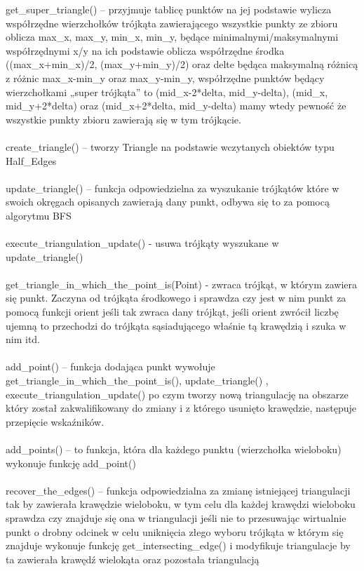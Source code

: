 \documentclass[12pt]{article}
\begin{document}
get\_super\_triangle() – przyjmuje tablicę punktów na jej podstawie wylicza współrzędne wierzchołków trójkąta zawierającego wszystkie punkty ze zbioru oblicza max\_x, max\_y, min\_x, min\_y, będące minimalnymi/maksymalnymi współrzędnymi x/y na ich podstawie oblicza współrzędne środka ((max\_x+min\_x)/2, (max\_y+min\_y)/2) oraz delte będąca maksymalną różnicą z różnic max\_x-min\_y oraz max\_y-min\_y, współrzędne punktów będący wierzchołkami „super trójkąta” to (mid\_x-2*delta, mid\_y-delta), (mid\_x, mid\_y+2*delta) oraz (mid\_x+2*delta, mid\_y-delta) mamy wtedy pewność że wszystkie punkty zbioru zawierają się w tym trójkącie.
\\ \\ 
create\_triangle() – tworzy Triangle na podstawie wczytanych obiektów typu Half\_Edges
\\ \\ 
update\_triangle() – funkcja odpowiedzielna za wyszukanie trójkątów które w swoich okręgach opisanych zawierają dany punkt, odbywa się to za pomocą algorytmu BFS
\\ \\ 
execute\_triangulation\_update() - usuwa trójkąty wyszukane w update\_triangle()
\\ \\ 
get\_triangle\_in\_which\_the\_point\_is(Point) - zwraca trójkąt, w którym zawiera się punkt. Zaczyna od trójkąta środkowego i sprawdza czy jest w nim punkt za pomocą funkcji orient jeśli tak zwraca dany trójkąt,  jeśli orient zwrócił liczbę ujemną to przechodzi do trójkąta sąsiadującego właśnie tą krawędzią i szuka w nim itd.
\\ \\ 
add\_point() – funkcja dodająca punkt wywołuje get\_triangle\_in\_which\_the\_point\_is(), update\_triangle() , execute\_triangulation\_update() po czym tworzy nową triangulację na obszarze który został zakwalifikowany do zmiany i z którego usunięto krawędzie, następuje przepięcie wskaźników.
\\ \\ 
add\_points() – to funkcja, która dla każdego punktu (wierzchołka wieloboku) wykonuje funkcję add\_point()
\\ \\ 
recover\_the\_edges() – funkcja odpowiedzialna za zmianę istniejącej triangulacji tak by zawierała krawędzie wieloboku, w tym celu dla każdej krawędzi wieloboku sprawdza czy znajduje się ona w triangulacji jeśli nie to przesuwając wirtualnie punkt o drobny odcinek w celu uniknięcia złego wyboru trójkąta w którym się znajduje wykonuje funkcję get\_intersecting\_edge() i modyfikuje triangulacje by ta zawierała krawędź wielokąta oraz pozostała triangulacją
\end{document}
